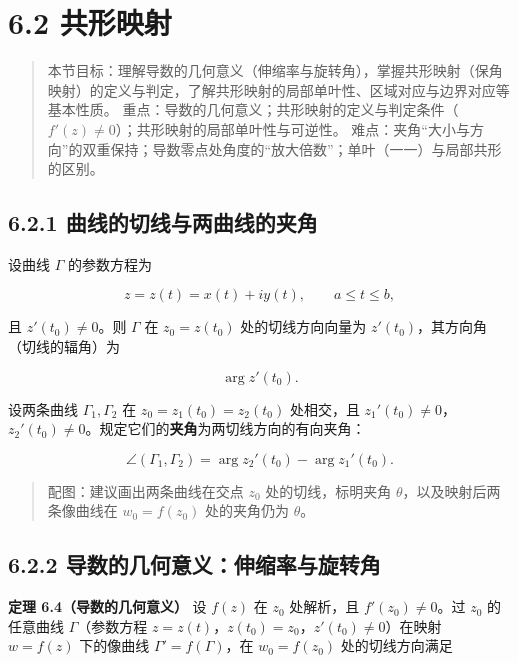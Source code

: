 \section{6.2 共形映射}\label{ux5171ux5f62ux6620ux5c04}

\begin{quote}
本节目标：理解导数的几何意义（伸缩率与旋转角），掌握共形映射（保角映射）的定义与判定，了解共形映射的局部单叶性、区域对应与边界对应等基本性质。
重点：导数的几何意义；共形映射的定义与判定条件（\(f'(z)\neq 0\)）；共形映射的局部单叶性与可逆性。
难点：夹角``大小与方向''的双重保持；导数零点处角度的``放大倍数''；单叶（一一）与局部共形的区别。
\end{quote}

\subsection{6.2.1
曲线的切线与两曲线的夹角}\label{ux66f2ux7ebfux7684ux5207ux7ebfux4e0eux4e24ux66f2ux7ebfux7684ux5939ux89d2}

设曲线 \(\Gamma\) 的参数方程为

\[
z=z(t)=x(t)+iy(t),\qquad a\le t\le b,
\]

且 \(z'(t_0)\neq 0\)。则 \(\Gamma\) 在 \(z_0=z(t_0)\) 处的切线方向向量为
\(z'(t_0)\)，其方向角（切线的辐角）为

\[
\arg z'(t_0).
\]

设两条曲线 \(\Gamma_1,\Gamma_2\) 在 \(z_0=z_1(t_0)=z_2(t_0)\) 处相交，且
\(z_1'(t_0)\neq 0\)，\(z_2'(t_0)\neq 0\)。规定它们的\textbf{夹角}为两切线方向的有向夹角：

\[
\angle(\Gamma_1,\Gamma_2) = \arg z_2'(t_0) - \arg z_1'(t_0).
\]

\begin{quote}
配图：建议画出两条曲线在交点 \(z_0\) 处的切线，标明夹角
\(\theta\)，以及映射后两条像曲线在 \(w_0=f(z_0)\) 处的夹角仍为
\(\theta\)。
\end{quote}

\subsection{6.2.2
导数的几何意义：伸缩率与旋转角}\label{ux5bfcux6570ux7684ux51e0ux4f55ux610fux4e49ux4f38ux7f29ux7387ux4e0eux65cbux8f6cux89d2}

\textbf{定理 6.4（导数的几何意义）} 设 \(f(z)\) 在 \(z_0\) 处解析，且
\(f'(z_0)\neq 0\)。过 \(z_0\) 的任意曲线 \(\Gamma\)（参数方程
\(z=z(t)\)，\(z(t_0)=z_0\)，\(z'(t_0)\neq 0\)）在映射 \(w=f(z)\)
下的像曲线 \(\Gamma'=f(\Gamma)\)，在 \(w_0=f(z_0)\) 处的切线方向满足

